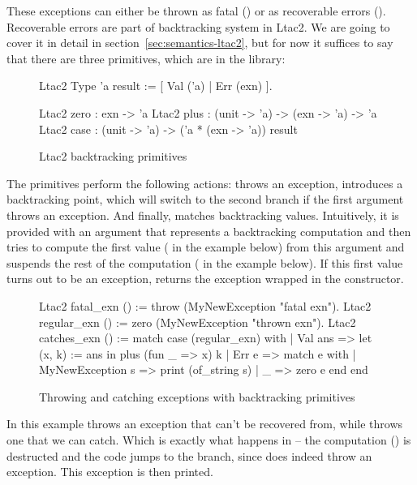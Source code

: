 These exceptions can either be thrown as fatal () or as recoverable errors ().
Recoverable errors are part of backtracking system in Ltac2.
We are going to cover it in detail in section~\ref{sec:semantics-ltac2}, but for now it suffices to say that there are three primitives, which are in the  library:

\begin{figure}[H]
\begin{coq}
Ltac2 Type 'a result := [ Val ('a) | Err (exn) ].

Ltac2 zero : exn -> 'a
Ltac2 plus : (unit -> 'a) -> (exn -> 'a) -> 'a
Ltac2 case : (unit -> 'a) -> ('a * (exn -> 'a)) result
\end{coq}
  \caption{Ltac2 backtracking primitives}
  \label{fig:ltac2-backtracking-prims}
\end{figure}

The primitives perform the following actions:  throws an exception,  introduces a backtracking point, which will switch to the second branch if the first argument throws an exception.
And finally,  matches backtracking values.
Intuitively, it is provided with an argument that represents a backtracking computation and
then tries to compute the first value ( in the example below) from this argument and suspends the rest of the computation ( in the example below).
If this first value turns out to be an exception,  returns the exception wrapped in the  constructor.

\begin{figure}[H]
\begin{coq}
Ltac2 fatal_exn () := throw (MyNewException "fatal exn").
Ltac2 regular_exn () := zero (MyNewException "thrown exn").
Ltac2 catches_exn () := match case (regular_exn) with
| Val ans =>
  let (x, k) := ans in
  plus (fun _ => x) k
| Err e => match e with
  | MyNewException s => print (of_string s)
  | _ => zero e
  end
end
\end{coq}
  \caption{Throwing and catching exceptions with backtracking primitives}
  \label{fig:throwing-catching-example}
\end{figure}

In this example  throws an exception that can't be recovered from, while  throws one that we can catch.
Which is exactly what happens in  -- the computation () is destructed and the code jumps to the  branch, since  does indeed throw an exception.
This exception is then printed.

